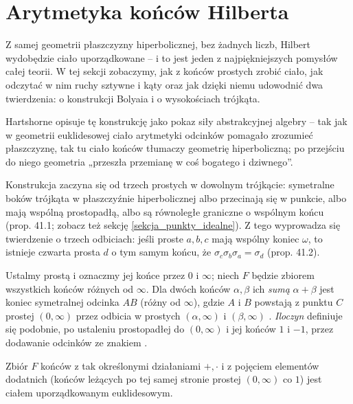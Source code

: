 \section{Arytmetyka końców Hilberta} %
\label{sekcja_ciala_koncow}

Z samej geometrii płaszczyzny hiperbolicznej, bez żadnych liczb, Hilbert wydobędzie ciało uporządkowane -- i to jest jeden z najpiękniejszych pomysłów całej teorii. %
W tej sekcji zobaczymy, jak z końców prostych zrobić ciało, jak odczytać w nim ruchy sztywne i kąty oraz jak dzięki niemu udowodnić dwa twierdzenia: o konstrukcji Bolyaia i o wysokościach trójkąta. %

Hartshorne \cite[s. 388]{hartshorne_2000} opisuje tę konstrukcję jako pokaz siły abstrakcyjnej algebry -- tak jak w geometrii euklidesowej ciało arytmetyki odcinków pomagało zrozumieć płaszczyznę, tak tu ciało końców tłumaczy geometrię hiperboliczną; po przejściu do niego geometria „przeszła przemianę w coś bogatego i dziwnego''. %

Konstrukcja zaczyna się od trzech prostych w dowolnym trójkącie: symetralne boków trójkąta w płaszczyźnie hiperbolicznej albo przecinają się w punkcie, albo mają wspólną prostopadłą, albo są równoległe graniczne o wspólnym końcu \cite[s. 388--389]{hartshorne_2000} (prop. 41.1; zobacz też sekcję \ref{sekcja_punkty_idealne}). %
Z tego wyprowadza się twierdzenie o trzech odbiciach: jeśli proste $a, b, c$ mają wspólny koniec $\omega$, to istnieje czwarta prosta $d$ o tym samym końcu, że $\sigma_c\sigma_b\sigma_a = \sigma_d$ \cite[s. 389]{hartshorne_2000} (prop. 41.2). %

Ustalmy prostą i oznaczmy jej końce przez $0$ i $\infty$; niech $F$ będzie zbiorem wszystkich końców różnych od $\infty$. %
Dla dwóch końców $\alpha, \beta$ ich \emph{sumą} $\alpha + \beta$ jest koniec symetralnej odcinka $AB$ (różny od $\infty$), gdzie $A$ i $B$ powstają z punktu $C$ prostej $(0,\infty)$ przez odbicia w prostych $(\alpha,\infty)$ i $(\beta,\infty)$ \cite[s. 390]{hartshorne_2000}. %
\emph{Iloczyn} definiuje się podobnie, po ustaleniu prostopadłej do $(0,\infty)$ i jej końców $1$ i $-1$, przez dodawanie odcinków ze znakiem \cite[s. 391]{hartshorne_2000}. %

\begin{theorem}
	Zbiór $F$ końców z tak określonymi działaniami $+, \cdot$ i z pojęciem elementów dodatnich (końców leżących po tej samej stronie prostej $(0,\infty)$ co $1$) jest ciałem uporządkowanym euklidesowym. %
\end{theorem}

